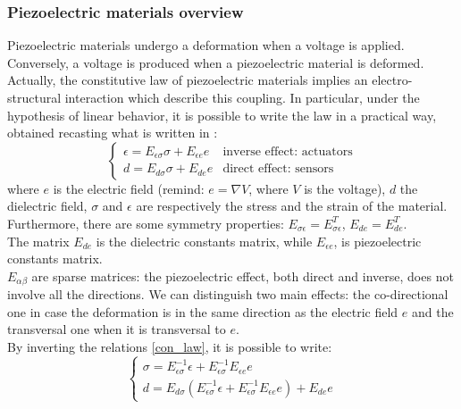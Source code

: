 \documentclass[twocolumn,a4paper,10pt,english]{article}
\begin{document}
            
            
        \subsubsection{Piezoelectric materials overview}
            Piezoelectric materials undergo a deformation when a voltage is applied. Conversely, a voltage is produced when a piezoelectric material is deformed.
            Actually, the constitutive law of piezoelectric materials implies an electro-structural interaction which describe this coupling. In particular, under the hypothesis of linear behavior, it is possible to write the law in a practical way, obtained recasting what is written in \cite{c1}:
            \begin{equation}
            \begin{cases}
            \epsilon = E_{\epsilon\sigma}\sigma + E_{\epsilon e}e & \text{inverse effect: actuators}\\d = E_{d\sigma}\sigma + E_{de}e & \text{direct effect: sensors}
            \end{cases}
            \label{con_law}
            \end{equation}
            where $e$ is the electric field (remind: $e=\nabla V$, where $V$ is the voltage), $d$ the dielectric field, $\sigma$ and $\epsilon$ are respectively the stress and the strain of the material. \\
            Furthermore, there are some symmetry properties: $E_{\sigma\epsilon}=E_{\sigma\epsilon}^T$, $E_{de}=E_{de}^T$.\\
            The matrix $E_{de}$ is the dielectric constants matrix, while $E_{\epsilon e}$, is piezoelectric constants matrix.\\
            $E_{\alpha\beta}$ are sparse matrices: the piezoelectric effect, both direct and inverse, does not involve all the directions. We can distinguish two main effects: the co-directional one in case the deformation is in the same direction as the electric field $e$ and the transversal one when it is transversal to $e$.\\
            By inverting the relations \ref{con_law}, it is possible to write:
            \begin{equation}
            \begin{cases}
            \sigma = E_{\epsilon\sigma}^{-1}\epsilon + E_{\epsilon\sigma}^{-1}E_{\epsilon e}e \\
            d = E_{d\sigma} (E_{\epsilon\sigma}^{-1}\epsilon + E_{\epsilon\sigma}^{-1}E_{\epsilon e}e) + E_{de}e 
            \end{cases}
            \label{inv_con_law}	
            \end{equation}
\end{document}
